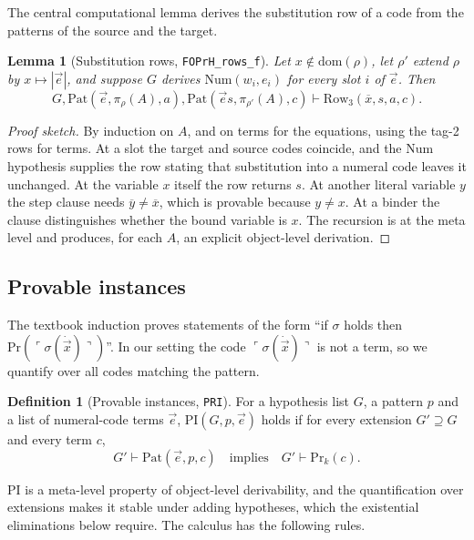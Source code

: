 \documentclass[11pt]{article}
\theoremstyle{plain}
\newtheorem{lemma}[theorem]{Lemma}
\theoremstyle{definition}
\newtheorem{definition}[theorem]{Definition}
\theoremstyle{remark}
\newcommand{\Prv}{\mathrm{Pr}}
\newcommand{\gn}[1]{\ulcorner #1 \urcorner}
\newcommand{\num}[1]{\overline{#1}}
\newcommand{\Row}{\mathrm{Row}}
\newcommand{\Num}{\mathrm{Num}}
\newcommand{\Pat}{\mathrm{Pat}}
\newcommand{\PRI}{\mathrm{PI}}
\newcommand{\rocq}[1]{\texttt{#1}}
\begin{document}
The central computational lemma derives the substitution row of a code
from the patterns of the source and the target.

\begin{lemma}[Substitution rows, \rocq{FOPrH\_rows\_f}]\label{lem:rows}
Let $x \notin \mathrm{dom}(\rho)$, let $\rho'$ extend $\rho$ by
$x \mapsto |\vec e|$, and suppose $G$ derives $\Num(w_i, e_i)$ for every
slot $i$ of $\vec e$.  Then
\[
  G, \Pat(\vec e, \pi_\rho(A), a), \Pat(\vec e s, \pi_{\rho'}(A), c)
  \vdash \Row_3(\num{x}, s, a, c).
\]
\end{lemma}

\begin{proof}[Proof sketch]
By induction on $A$, and on terms for the equations, using the tag-2
rows for terms.  At a slot the target and source codes coincide, and the
$\Num$ hypothesis supplies the row stating that substitution into a
numeral code leaves it unchanged.  At the variable $x$ itself the row
returns $s$.  At another literal variable $y$ the step clause needs
$\num{y} \neq \num{x}$, which is provable because $y \neq x$.  At a
binder the clause distinguishes whether the bound variable is $x$.  The
recursion is at the meta level and produces, for each $A$, an explicit
object-level derivation.
\end{proof}

\subsection{Provable instances}\label{sec:pi}

The textbook induction proves statements of the form ``if $\sigma$ holds
then $\Prv(\gn{\sigma(\dot{\vec x})})$''.  In our setting the code
$\gn{\sigma(\dot{\vec x})}$ is not a term, so we quantify over all codes
matching the pattern.

\begin{definition}[Provable instances, \rocq{PRI}]
For a hypothesis list $G$, a pattern $p$ and a list of numeral-code
terms $\vec e$, $\PRI(G, p, \vec e)$ holds if for every extension
$G' \supseteq G$ and every term $c$,
\[
  G' \vdash \Pat(\vec e, p, c) \quad\text{implies}\quad G' \vdash \Prv_k(c).
\]
\end{definition}

$\PRI$ is a meta-level property of object-level derivability, and the
quantification over extensions makes it stable under adding hypotheses,
which the existential eliminations below require.  The calculus has the
following rules.
\end{document}
